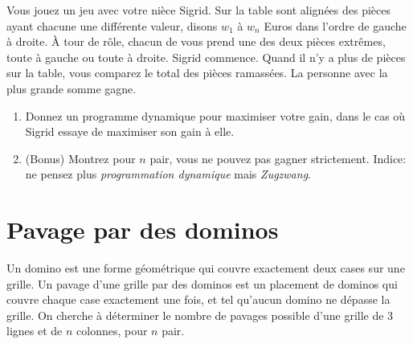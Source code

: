 \documentclass[12pt]{article}
\begin{document}
Vous jouez un jeu avec votre nièce Sigrid.  Sur la table sont alignées des pièces ayant chacune une différente valeur, disons $w_1$ à $w_n$ Euros dans l'ordre de gauche à droite.  À tour de rôle, chacun de vous prend une des deux pièces extrêmes, toute à gauche ou toute à droite.  Sigrid commence. Quand il n'y a plus de pièces sur la table, vous comparez le total des pièces ramassées.  La personne avec la plus grande somme gagne.
\begin{figure}[ht]
\begin{center}
\end{center}
\end{figure}


\begin{enumerate}
    \item Donnez un programme dynamique pour maximiser votre gain, dans le cas où Sigrid essaye de maximiser son gain à elle.
    \item (Bonus) Montrez pour $n$ pair, vous ne pouvez pas gagner strictement. Indice: ne pensez plus \emph{programmation dynamique} mais \emph{Zugzwang}.
\end{enumerate}


\section{Pavage par des dominos}

Un domino est une forme géométrique qui couvre exactement deux cases sur une grille.  Un pavage d'une grille par des dominos est un placement de dominos qui couvre chaque case exactement une fois, et tel qu'aucun domino ne dépasse la grille.  On cherche à déterminer le nombre de pavages possible d'une grille de 3 lignes et de $n$ colonnes, pour $n$ pair.

\begin{center}
\end{center}
\end{document}

